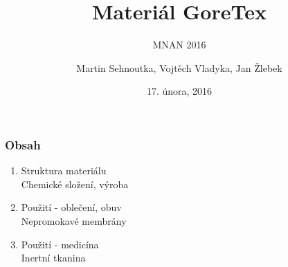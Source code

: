 \documentclass{beamer}
\title{Materiál GoreTex}
\subtitle{MNAN 2016}
\author{Martin Sehnoutka, Vojtěch Vladyka, Jan Žlebek}
\date{17. února, 2016}
\begin{document}
  \frame{\titlepage}
   
  \begin{frame}
	\frametitle{Obsah}
	\begin{enumerate}
	  \item Struktura materiálu
	  \\ \textcolor{ExecusharesGrey}{\footnotesize\hspace{1em} Chemické složení, výroba}	
	  \item Použití - oblečení, obuv
	  \\ \textcolor{ExecusharesGrey}{\footnotesize\hspace{1em} Nepromokavé membrány}
	  \item Použití - medicína
	  \\ \textcolor{ExecusharesGrey}{\footnotesize\hspace{1em} Inertní tkanina}
	\end{enumerate}
	\end{frame}
	
	
	
	
	
\end{document}
